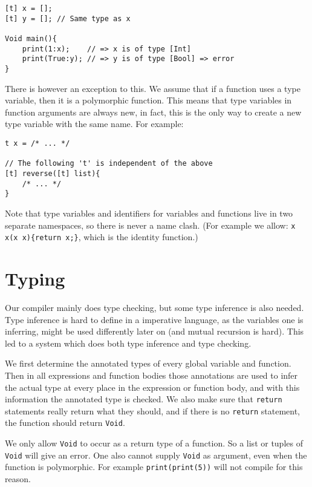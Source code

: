 \documentclass[11pt]{amsart}
\begin{document}
\begin{lstlisting}[language=spl]
[t] x = [];
[t] y = []; // Same type as x

Void main(){
	print(1:x);    // => x is of type [Int]
	print(True:y); // => y is of type [Bool] => error
}
\end{lstlisting}

There is however an exception to this. We assume that if a function uses a type variable, then it is a polymorphic function. This means that type variables in function arguments are always new, in fact, this is the only way to create a new type variable with the same name. For example:

\begin{lstlisting}[language=spl]
t x = /* ... */

// The following 't' is independent of the above
[t] reverse([t] list){
	/* ... */
}
\end{lstlisting}

Note that type variables and identifiers for variables and functions live in two separate namespaces, so there is never a name clash. (For example we allow: \texttt{x x(x x)\{return x;\}}, which is the identity function.)

\section{Typing}

Our compiler mainly does type checking, but some type inference is also needed. Type inference is hard to define in a imperative language, as the variables one is inferring, might be used differently later on (and mutual recursion is hard). This led to a system which does both type inference and type checking.

We first determine the annotated types of every global variable and function. Then in all expressions and function bodies those annotations are used to infer the actual type at every place in the expression or function body, and with this information the annotated type is checked. We also make sure that \texttt{return} statements really return what they should, and if there is no \texttt{return} statement, the function should return \texttt{Void}.

We only allow \texttt{Void} to occur as a return type of a function. So a list or tuples of \texttt{Void} will give an error. One also cannot supply \texttt{Void} as argument, even when the function is polymorphic. For example \texttt{print(print(5))} will not compile for this reason.
\end{document}
